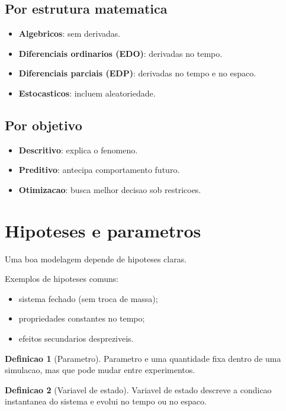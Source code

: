 \documentclass[12pt,a4paper,oneside]{book}
\theoremstyle{definition}
\newtheorem{definition}{Definicao}[chapter]
\begin{document}
\subsection{Por estrutura matematica}

\begin{itemize}
    \item \textbf{Algebricos}: sem derivadas.
    \item \textbf{Diferenciais ordinarios (EDO)}: derivadas no tempo.
    \item \textbf{Diferenciais parciais (EDP)}: derivadas no tempo e no espaco.
    \item \textbf{Estocasticos}: incluem aleatoriedade.
\end{itemize}

\subsection{Por objetivo}

\begin{itemize}
    \item \textbf{Descritivo}: explica o fenomeno.
    \item \textbf{Preditivo}: antecipa comportamento futuro.
    \item \textbf{Otimizacao}: busca melhor decisao sob restricoes.
\end{itemize}

\section{Hipoteses e parametros}

Uma boa modelagem depende de hipoteses claras.

Exemplos de hipoteses comuns:
\begin{itemize}
    \item sistema fechado (sem troca de massa);
    \item propriedades constantes no tempo;
    \item efeitos secundarios despreziveis.
\end{itemize}

\begin{definition}[Parametro]
Parametro e uma quantidade fixa dentro de uma simulacao, mas que pode mudar entre experimentos.
\end{definition}

\begin{definition}[Variavel de estado]
Variavel de estado descreve a condicao instantanea do sistema e evolui no tempo ou no espaco.
\end{definition}
\end{document}

